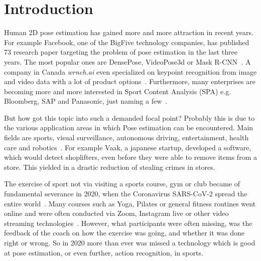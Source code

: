


\chapter{Introduction} %

\label{introduction} %
Human 2D pose estimation has gained more and more attraction in recent years.
For example Facebook, one of the BigFive technology companies, has published 73 research paper targeting the
problem of pose estimation in the last three years.
The most popular ones are DensePose, VideoPose3d or Mask R-CNN~\cite{fbPub, DensePose, videopose3d, maskrcnn}.
A company in Canada \textit{wrnch.ai} even specialized on keypoint recognition from image and video data with a
lot of product options~\cite{wrnch}.
Furthermore, many enterprises are becoming more and more interested in Sport Content Analysis (SPA)
e.g. Bloomberg, SAP and Panasonic, just naming a few~\cite{sappanasonic, spaBloomberg}.\\
\par
%
But how got this topic into such a demanded focal point?
Probably this is due to the various application areas in which Pose estimation can be encountered.
Main fields are sports, visual surveillance, autonomous driving, entertainment, health care and
robotics~\cite{olympicsport, surveillance, kinectWalkDepression}.
For example Vaak, a japanese startup, developed a software, which would detect shoplifters,
even before they were able to remove items from a store.
This yielded in a drastic reduction of stealing crimes in stores.\\
\par
%
The exercise of sport not via visiting a sports course, gym or club became of fundamental severance in 2020,
when the Coronavirus SARS-CoV-2 spread the entire world~\cite{coronarki}.
Many courses such as Yoga, Pilates or general fitness routines went online
and were often conducted via Zoom, Instagram live or other video streaming technologies~\cite{coronalife}.
However, what participants were often missing, was the feedback of the coach on how the exercise was going, and
whether it was done right or wrong.
So in 2020 more than ever was missed a technology which is good at pose estimation, or even further, action
recognition, in sports.\\
